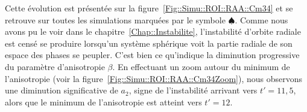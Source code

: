 		Cette évolution est présentée sur la figure~\ref{Fig::Simu::ROI::RAA::Cm34} et se retrouve
		sur toutes les simulations marquées par le symbole $\spadesuit$. Comme nous avons pu le voir dans le chapitre~\ref{Chap::Instabilite},
		l'instabilité d'orbite radiale est censé se produire lorsqu'un système sphérique voit la partie radiale de son espace des phases se
		peupler. C'est bien ce qu'indique la diminution progressive du paramètre d'anisotropie $\beta$.
		En effectuant un zoom autour du
		minimum de l'anisotropie (voir la figure~\ref{Fig::Simu::ROI::RAA::Cm34Zoom}), nous observons une diminution significative de $a_2$,
		signe de l'instabilité arrivant vers $t'=11,5$, alors que le minimum de l'anisotropie est atteint vers $t'=12$.

